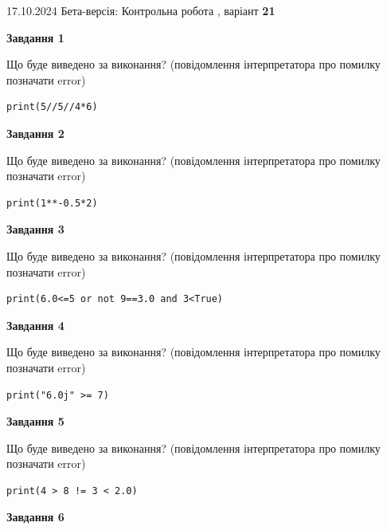 \documentclass[12pt, ukrainian]{article}
\begin{document}
{\Large{17.10.2024 Бета-версія: Контрольна робота , варіант  \No \textbf { 21 }\par}}
{
\begin {large}
{\begin {center}\textbf{Завдання 1}\end {center}}

Що буде виведено за виконання? (повідомлення інтерпретатора про помилку позначати error)\par
\begin{verbatim}
print(5//5//4*6)
\end{verbatim}

{\begin {center}\textbf{Завдання 2}\end {center}}

Що буде виведено за виконання? (повідомлення інтерпретатора про помилку позначати error)\par
\begin{verbatim}
print(1**-0.5*2)
\end{verbatim}

{\begin {center}\textbf{Завдання 3}\end {center}}

Що буде виведено за виконання? (повідомлення інтерпретатора про помилку позначати error)\par
\begin{verbatim}
print(6.0<=5 or not 9==3.0 and 3<True)
\end{verbatim}

{\begin {center}\textbf{Завдання 4}\end {center}}

Що буде виведено за виконання? (повідомлення інтерпретатора про помилку позначати error)\par
\begin{verbatim}
print("6.0j" >= 7)
\end{verbatim}

{\begin {center}\textbf{Завдання 5}\end {center}}

Що буде виведено за виконання? (повідомлення інтерпретатора про помилку позначати error)\par
\begin{verbatim}
print(4 > 8 != 3 < 2.0)
\end{verbatim}

{\begin {center}\textbf{Завдання 6}\end {center}}


\end{large}}
\end{document}
